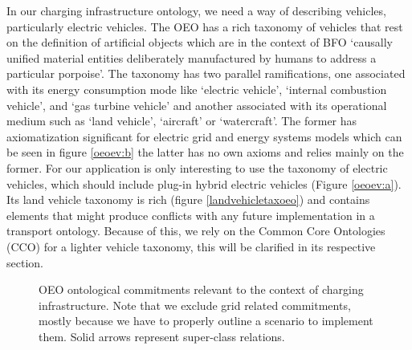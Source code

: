 In our charging infrastructure ontology, we need a way of describing vehicles,
particularly electric vehicles. The OEO has a rich taxonomy of vehicles that
rest on the definition of artificial objects which are in the context of BFO
`causally unified material entities deliberately manufactured by humans to
address a particular porpoise'. The taxonomy has two parallel ramifications, one
associated with its energy consumption mode like `electric vehicle', `internal
combustion vehicle', and `gas turbine vehicle' and another associated with its
operational medium such as `land vehicle', `aircraft' or `watercraft'. The
former has axiomatization significant for electric grid and energy systems
models which can be seen in figure \ref{oeoev:b} the latter has no own axioms and
relies mainly on the former. For our application is only interesting to use the
taxonomy of electric vehicles, which should include plug-in hybrid electric
vehicles (Figure \ref{oeoev:a}). Its land vehicle taxonomy is rich (figure
\ref{landvehicletaxoeo}) and contains elements that might produce conflicts with
any future implementation in a transport ontology. Because of this, we rely on
the Common Core Ontologies (CCO) for a lighter vehicle taxonomy, this will be
clarified in its respective section.

\begin{figure}
    \centering
    \caption{OEO ontological commitments relevant to the context of charging infrastructure. Note that we exclude grid related commitments, mostly because we have to properly outline a scenario to implement them. Solid arrows represent super-class relations.}
\end{figure}

